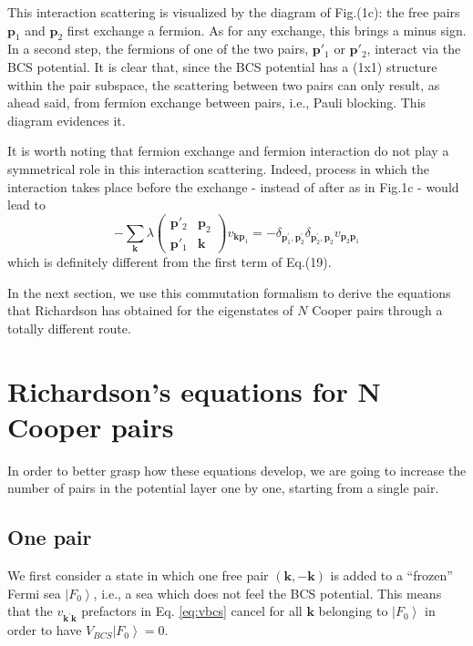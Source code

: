 \documentclass[aps,prb,superscriptaddress,showpacs,reprint,lengthcheck]{revtex4}
\newcommand{\vk}{\ensuremath{\mathbf{k}}}
\newcommand{\vp}{\ensuremath{\mathbf{p}}}
\begin{document}
This interaction scattering is visualized by the diagram of Fig.(1c): the free pairs $\mathbf{p}_1$ and $\mathbf{p}_2$ first
exchange a fermion. As for any exchange, this brings a minus sign. In a
second step, the fermions of one of the two pairs, $\mathbf{p}' _1$ or ${\mathbf{p}}' _2$,  interact via the BCS
potential. It is clear that, since the BCS potential has a (1x1)
structure within the pair subspace, the scattering between two pairs can only result, as ahead said, from
fermion exchange between pairs, i.e., Pauli blocking. This diagram evidences it.

It is worth noting that fermion exchange and fermion interaction do not play a symmetrical role in this interaction scattering. Indeed, process in which the interaction takes place before the exchange - instead of after as in Fig.1c - would lead to
\begin{equation}
-\sum_\vk \lambda\left(%
\begin{smallmatrix}\vp'_2&\vp_2\\\vp'_1&\mathbf{k}\end{smallmatrix}\right)v_{\mathbf{k}\mathbf{p} _1 } =-\delta_{\mathbf{p}
^{\prime}_1,\mathbf{p}^{\prime} _2}\delta_{\mathbf{p}
^{\prime}_2,\mathbf{p} _2}v_{\mathbf{p} _2\mathbf{p} _1}
\end{equation}
which is definitely different from the first term of Eq.(19).

In the next section, we use this commutation formalism to derive the equations that Richardson has obtained for the eigenstates of $N$ Cooper pairs through a totally different route.

\section{Richardson's equations for N Cooper pairs\label{sec:rich}}

In order to better grasp how these equations develop, we are going to increase the number of pairs in the potential layer one by one, starting from a single pair.

\subsection{One pair}

We first consider a state in which one free pair $(\mathbf{k} ,-\mathbf{k} )$ is added to a
``frozen'' Fermi sea $\left|F_0\right> $, i.e., a sea which does not feel the BCS potential.
This means that the $v_{\mathbf{k} ^{\prime}\mathbf{k} }$ prefactors in Eq.%
\eqref{eq:vbcs} cancel for all $\mathbf{k} $ belonging to $\left|F_0\right> $ in order to have $V_{BCS} \left|F_0\right>=0$.
\end{document}
